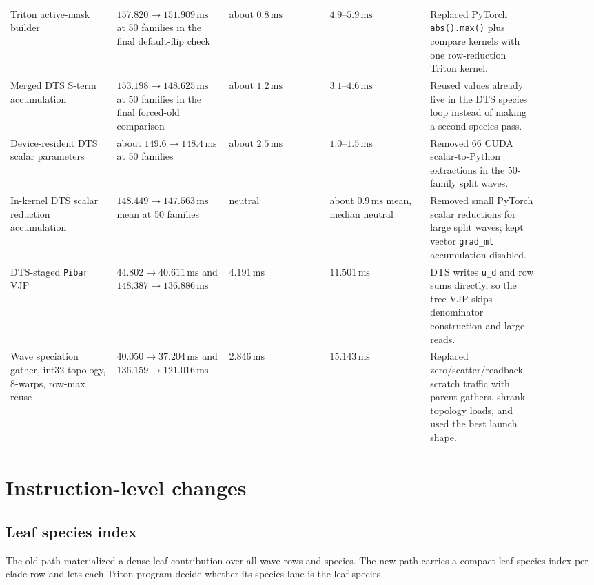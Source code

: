 \documentclass[11pt]{article}
\newcommand{\ms}{\,\mathrm{ms}}
\newcommand{\code}[1]{\texttt{#1}}
\begin{document}
\begin{longtable}{p{0.18\linewidth}p{0.19\linewidth}p{0.17\linewidth}p{0.17\linewidth}p{0.19\linewidth}}
Triton active-mask builder & $157.820 \to 151.909\ms$ at 50 families in the final default-flip check &
about $0.8\ms$ & $4.9$--$5.9\ms$ & Replaced PyTorch \code{abs().max()} plus compare kernels with one row-reduction Triton kernel. \\

Merged DTS S-term accumulation & $153.198 \to 148.625\ms$ at 50 families in the final forced-old comparison &
about $1.2\ms$ & $3.1$--$4.6\ms$ & Reused values already live in the DTS species loop instead of making a second species pass. \\

Device-resident DTS scalar parameters & about $149.6 \to 148.4\ms$ at 50 families &
about $2.5\ms$ & $1.0$--$1.5\ms$ & Removed 66 CUDA scalar-to-Python extractions in the 50-family split waves. \\

In-kernel DTS scalar reduction accumulation & $148.449 \to 147.563\ms$ mean at 50 families &
neutral & about $0.9\ms$ mean, median neutral & Removed small PyTorch scalar reductions for large split waves; kept vector \code{grad\_mt} accumulation disabled. \\

DTS-staged \code{Pibar} VJP & $44.802 \to 40.611\ms$ and $148.387 \to 136.886\ms$ &
$4.191\ms$ & $11.501\ms$ & DTS writes \code{u\_d} and row sums directly, so the tree VJP skips denominator construction and large reads. \\

Wave speciation gather, int32 topology, 8-warps, row-max reuse & $40.050 \to 37.204\ms$ and $136.159 \to 121.016\ms$ &
$2.846\ms$ & $15.143\ms$ & Replaced zero/scatter/readback scratch traffic with parent gathers, shrank topology loads, and used the best launch shape. \\
\bottomrule
\end{longtable}

\section{Instruction-level changes}

\subsection{Leaf species index}

The old path materialized a dense leaf contribution over all wave rows and
species.  The new path carries a compact leaf-species index per clade row and
lets each Triton program decide whether its species lane is the leaf species.
\end{document}

